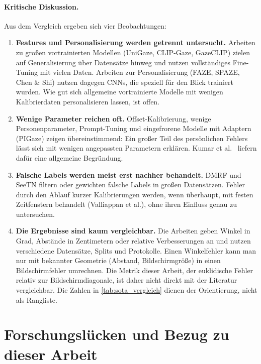 \paragraph{Kritische Diskussion.}
Aus dem Vergleich ergeben sich vier Beobachtungen:
\begin{enumerate}
  \item \textbf{Features und Personalisierung werden getrennt untersucht.}
        Arbeiten zu großen vortrainierten Modellen (UniGaze, CLIP-Gaze,
        GazeCLIP) zielen auf Generalisierung über Datensätze hinweg und nutzen
        vollständiges Fine-Tuning mit vielen Daten. Arbeiten zur
        Personalisierung (FAZE, SPAZE, Chen \& Shi) nutzen dagegen CNNs, die
        speziell für den Blick trainiert wurden. Wie gut sich allgemeine
        vortrainierte Modelle mit wenigen Kalibrierdaten personalisieren
        lassen, ist offen.
  \item \textbf{Wenige Parameter reichen oft.} Offset-Kalibrierung, wenige
        Personenparameter, Prompt-Tuning und eingefrorene Modelle mit Adaptern
        (PIGaze) zeigen übereinstimmend: Ein großer Teil des persönlichen
        Fehlers lässt sich mit wenigen angepassten Parametern erklären. Kumar
        et al.~\cite{kumar2022finetuning} liefern dafür eine allgemeine
        Begründung.
  \item \textbf{Falsche Labels werden meist erst nachher behandelt.} DMRF und
        SeeTN filtern oder gewichten falsche Labels in großen Datensätzen.
        Fehler durch den Ablauf kurzer Kalibrierungen werden, wenn überhaupt,
        mit festen Zeitfenstern behandelt (Valliappan et al.), ohne ihren
        Einfluss genau zu untersuchen.
  \item \textbf{Die Ergebnisse sind kaum vergleichbar.} Die Arbeiten geben
        Winkel in Grad, Abstände in Zentimetern oder relative Verbesserungen an
        und nutzen verschiedene Datensätze, Splits und Protokolle. Einen
        Winkelfehler kann man nur mit bekannter Geometrie (Abstand,
        Bildschirmgröße) in einen Bildschirmfehler umrechnen. Die Metrik dieser
        Arbeit, der euklidische Fehler relativ zur Bildschirmdiagonale, ist
        daher nicht direkt mit der Literatur vergleichbar. Die Zahlen in
        \cref{tab:sota_vergleich} dienen der Orientierung, nicht als Rangliste.
\end{enumerate}

\section{Forschungslücken und Bezug zu dieser Arbeit}
\label{sec:luecken}
